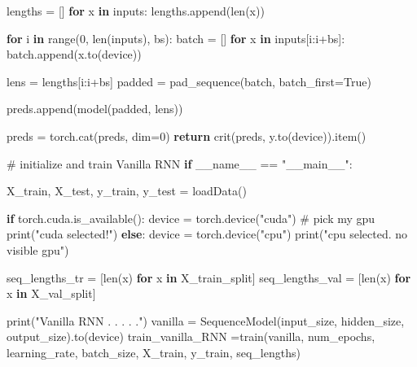 \documentclass[
  letterpaper,
  DIV=11,
  numbers=noendperiod]{scrartcl}
\newenvironment{Shaded}{\begin{snugshade}}{\end{snugshade}}
\newcommand{\BuiltInTok}[1]{\textcolor[rgb]{0.00,0.23,0.31}{#1}}
\newcommand{\CommentTok}[1]{\textcolor[rgb]{0.37,0.37,0.37}{#1}}
\newcommand{\ControlFlowTok}[1]{\textcolor[rgb]{0.00,0.23,0.31}{\textbf{#1}}}
\newcommand{\DecValTok}[1]{\textcolor[rgb]{0.68,0.00,0.00}{#1}}
\newcommand{\KeywordTok}[1]{\textcolor[rgb]{0.00,0.23,0.31}{\textbf{#1}}}
\newcommand{\NormalTok}[1]{\textcolor[rgb]{0.00,0.23,0.31}{#1}}
\newcommand{\OperatorTok}[1]{\textcolor[rgb]{0.37,0.37,0.37}{#1}}
\newcommand{\StringTok}[1]{\textcolor[rgb]{0.13,0.47,0.30}{#1}}
\newcommand{\VariableTok}[1]{\textcolor[rgb]{0.07,0.07,0.07}{#1}}
\begin{document}
\begin{Shaded}
\begin{Highlighting}[]
\NormalTok{    lengths }\OperatorTok{=}\NormalTok{ []}
    \ControlFlowTok{for}\NormalTok{ x }\KeywordTok{in}\NormalTok{ inputs:}
\NormalTok{        lengths.append(}\BuiltInTok{len}\NormalTok{(x))}

    \ControlFlowTok{for}\NormalTok{ i }\KeywordTok{in} \BuiltInTok{range}\NormalTok{(}\DecValTok{0}\NormalTok{, }\BuiltInTok{len}\NormalTok{(inputs), bs):}
\NormalTok{        batch }\OperatorTok{=}\NormalTok{ []}
        \ControlFlowTok{for}\NormalTok{ x }\KeywordTok{in}\NormalTok{ inputs[i:i}\OperatorTok{+}\NormalTok{bs]:}
\NormalTok{            batch.append(x.to(device))}

\NormalTok{        lens }\OperatorTok{=}\NormalTok{ lengths[i:i}\OperatorTok{+}\NormalTok{bs]}
\NormalTok{        padded }\OperatorTok{=}\NormalTok{ pad\_sequence(batch, batch\_first}\OperatorTok{=}\VariableTok{True}\NormalTok{)}

\NormalTok{        preds.append(model(padded, lens))}

\NormalTok{    preds }\OperatorTok{=}\NormalTok{ torch.cat(preds, dim}\OperatorTok{=}\DecValTok{0}\NormalTok{)}
    \ControlFlowTok{return}\NormalTok{ crit(preds, y.to(device)).item()}



\CommentTok{\# initialize and train Vanilla RNN}
\ControlFlowTok{if} \VariableTok{\_\_name\_\_} \OperatorTok{==} \StringTok{"\_\_main\_\_"}\NormalTok{:}

\NormalTok{    X\_train, X\_test, y\_train, y\_test }\OperatorTok{=}\NormalTok{ loadData()}

    \ControlFlowTok{if}\NormalTok{ torch.cuda.is\_available():}
\NormalTok{        device }\OperatorTok{=}\NormalTok{ torch.device(}\StringTok{"cuda"}\NormalTok{) }\CommentTok{\# pick my gpu}
        \BuiltInTok{print}\NormalTok{(}\StringTok{"cuda selected!"}\NormalTok{)}
    \ControlFlowTok{else}\NormalTok{:}
\NormalTok{        device }\OperatorTok{=}\NormalTok{ torch.device(}\StringTok{"cpu"}\NormalTok{)}
        \BuiltInTok{print}\NormalTok{(}\StringTok{"cpu selected. no visible gpu"}\NormalTok{)}



\NormalTok{    seq\_lengths\_tr  }\OperatorTok{=}\NormalTok{ [}\BuiltInTok{len}\NormalTok{(x) }\ControlFlowTok{for}\NormalTok{ x }\KeywordTok{in}\NormalTok{ X\_train\_split]}
\NormalTok{    seq\_lengths\_val }\OperatorTok{=}\NormalTok{ [}\BuiltInTok{len}\NormalTok{(x) }\ControlFlowTok{for}\NormalTok{ x }\KeywordTok{in}\NormalTok{ X\_val\_split]}

    \BuiltInTok{print}\NormalTok{(}\StringTok{"Vanilla RNN . . . . ."}\NormalTok{)}
\NormalTok{    vanilla }\OperatorTok{=}\NormalTok{ SequenceModel(input\_size, hidden\_size, output\_size).to(device)}
\NormalTok{    train\_vanilla\_RNN }\OperatorTok{=}\NormalTok{train(vanilla, num\_epochs, learning\_rate, batch\_size, X\_train, y\_train, seq\_lengths)}



\end{Highlighting}
\end{Shaded}
\end{document}
